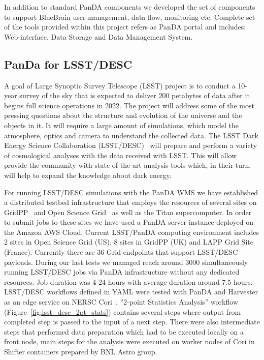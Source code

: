 \documentclass{webofc}
\begin{document}
In addition to standard PanDA components we developed the set of components to support BlueBrain user management, data flow, monitoring etc. 
Complete set of the tools provided within this project refers as PanDA portal and includes: Web-interface, Data Storage and Data Management System. 


\subsection{PanDa for LSST/DESC} \label{section_lsst_desc}

A goal of Large Synoptic Survey Telescope (LSST) project is to conduct a 10-year survey of the sky that is expected to deliver 200 petabytes of data after it begins full science operations in 2022. 
The project will address some of the most pressing questions about the structure and evolution of the universe and the objects in it. 
It will require a large amount of simulations, which model the atmosphere, optics and camera to understand the collected data. 
The LSST Dark Energy Science Collaboration (LSST/DESC)~\cite{lsst-desc} will prepare and perform a variety of cosmological analyses with the data received with LSST. 
This will allow provide the community with state of the art analysis tools which, in their turn, will help to expand the knowledge about dark energy.

For running LSST/DESC simulations with the PanDA WMS we have established a distributed testbed infrastructure that employs the resources of several sites on GridPP~\cite{GridPP_Collaboration_2005} and Open Science Grid~\cite{Pordes_2007} as well as the Titan supercomputer. In order to submit jobs to these sites we have used a PanDA server instance deployed on the Amazon AWS Cloud. 
Current LSST/PanDA computing environment includes 2 sites in Open Science Grid (US), 8 sites in GridPP (UK) and LAPP Grid Site (France). 
Currently there are 36 Grid endpoints that support LSST/DESC payloads. During our last tests we managed reach around 3000 simultaneously running LSST/DESC jobs via PanDA infrastructure without any dedicated resources. 
Job duration was 4-24 hours with average duration around 7.5 hours.
LSST/DESC workflows defined in YAML were tested with PanDA and Harvester as an edge service on NERSC Cori~\cite{NERSC_Cori}. ''2-point Statistics Analysis'' workflow (Figure~\ref{fig:lsst_desc_2pt_stats}) contains several steps where output from completed step is passed to the input of a next step. There were also intermediate steps that performed data preparation which had to be executed locally on a front node, main steps for the analysis were executed on worker nodes of Cori in Shifter containers prepared by BNL Astro group.
\end{document}
